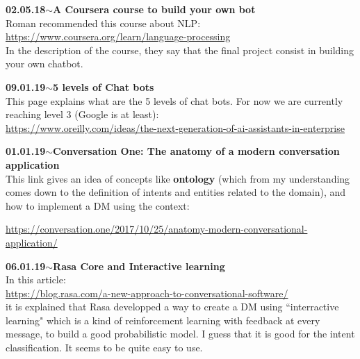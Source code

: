 \documentclass[11pt,a4paper]{article}
\newenvironment{loggentry}[2]%
{\noindent\textbf{#1}\hspace{1cm}$\mathbf{\sim}$\text{ }\textbf{#2}\\}{\vspace{0.5cm}}
\begin{document}
\begin{loggentry}{02.05.18}{A Coursera course to build your own bot}
Roman recommended this course about NLP:\\
\url{https://www.coursera.org/learn/language-processing}\\
In the description of the course, they say that the final project consist in building your own chatbot.
\end{loggentry}

\begin{loggentry}{09.01.19}{5 levels of Chat bots}

This page explains what are the 5 levels of chat bots. For now we are currently reaching level 3 (Google is at least):\\
\url{https://www.oreilly.com/ideas/the-next-generation-of-ai-assistants-in-enterprise}\\

\end{loggentry}

\begin{loggentry}{01.01.19}{Conversation One: The anatomy of a modern conversation application}

This link gives an idea of concepts like \textbf{ontology} (which from my understanding comes down to the definition of intents and entities related to the domain), and how to implement a DM using the context:

\url{https://conversation.one/2017/10/25/anatomy-modern-conversational-application/}

\end{loggentry}


\begin{loggentry}{06.01.19}{Rasa Core and Interactive learning}

In this article:\\
\url{https://blog.rasa.com/a-new-approach-to-conversational-software/}\\
it is explained that Rasa developped a way to create a DM using ``interractive learning" which is a kind of reinforcement learning with feedback at every message, to build a good probabilistic model. I guess that it is good for the intent classification. It seems to be quite easy to use.

\end{loggentry}
\end{document}
